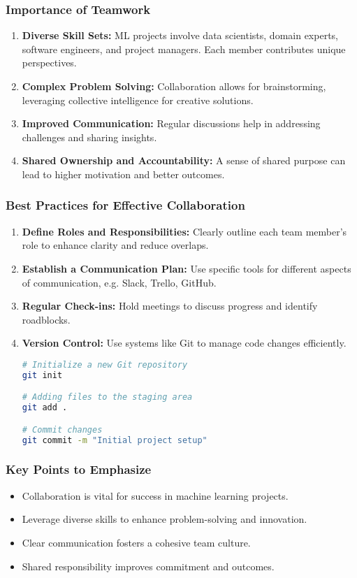 \documentclass[aspectratio=169]{beamer}
\begin{document}
\begin{frame}[fragile]
    \frametitle{Importance of Teamwork}
    \begin{enumerate}
        \item \textbf{Diverse Skill Sets:} 
            ML projects involve data scientists, domain experts, software engineers, and project managers. Each member contributes unique perspectives.
        \item \textbf{Complex Problem Solving:}
            Collaboration allows for brainstorming, leveraging collective intelligence for creative solutions.
        \item \textbf{Improved Communication:}
            Regular discussions help in addressing challenges and sharing insights.
        \item \textbf{Shared Ownership and Accountability:}
            A sense of shared purpose can lead to higher motivation and better outcomes.
    \end{enumerate}
\end{frame}

\begin{frame}[fragile]
    \frametitle{Best Practices for Effective Collaboration}
    \begin{enumerate}
        \item \textbf{Define Roles and Responsibilities:}
            Clearly outline each team member's role to enhance clarity and reduce overlaps.
        \item \textbf{Establish a Communication Plan:}
            Use specific tools for different aspects of communication, e.g. Slack, Trello, GitHub.
        \item \textbf{Regular Check-ins:}
            Hold meetings to discuss progress and identify roadblocks.
        \item \textbf{Version Control:}
            Use systems like Git to manage code changes efficiently.
            \begin{lstlisting}[language=bash]
# Initialize a new Git repository
git init

# Adding files to the staging area
git add .

# Commit changes
git commit -m "Initial project setup"
            \end{lstlisting}
    \end{enumerate}
\end{frame}

\begin{frame}[fragile]
    \frametitle{Key Points to Emphasize}
    \begin{itemize}
        \item Collaboration is vital for success in machine learning projects.
        \item Leverage diverse skills to enhance problem-solving and innovation.
        \item Clear communication fosters a cohesive team culture.
        \item Shared responsibility improves commitment and outcomes.
    \end{itemize}
\end{frame}
\end{document}
